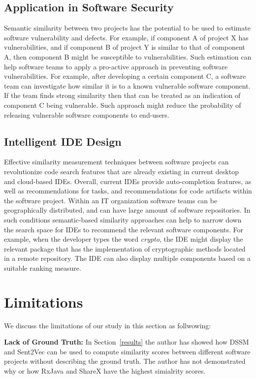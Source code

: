 \documentclass[conference]{IEEEtran}
\begin{document}
\subsection{Application in Software Security}
Semantic similarity between two projects has the potential to be used to estimate software vulnerability and defects. For example, if component A of project X has vulnerabilities, and if component B of project Y is similar to that of component A, then component B might be susceptible to vulnerabilities. Such estimation can help software teams to apply a pro-active approach in preventing software vulnerabilities. For example, after developing a certain component C, a software team can investigate how similar it is to a known vulnerable software component. If the team finds strong similarity then that can be treated as an indication of component C being vulnerable. Such approach might reduce the probability of releasing vulnerable software components to end-users. 
\subsection{Intelligent IDE Design}  
Effective similarity measurement techniques between software projects can revolutionize code search features that are already existing in current desktop and cloud-based IDEs. Overall, current IDEs provide auto-completion features, as well as recommendations for tasks, and recommendations for code artifacts within the software project. Within an IT organization software teams can be geographically distributed, and can have large amount of software repositories. In such conditions semantic-based similarity approaches can help to narrow down the search space for IDEs to recommend the relevant software components. For example, when the developer types the word \textit{crypto}, the IDE might display the relevant package that has the implementation of cryptographic methods located in a remote repository. The IDE can also display multiple components based on a suitable ranking measure.  




\section{Limitations}
\label{limitation}
We discuss the limitations of our study in this section as follwowing: 

\textbf{Lack of Ground Truth:} In Section~\ref{results} the author has showed how DSSM and Sent2Vec can be used to compute similarity scores between different software projects without describing the ground truth. The author has not demonstrated why or how RxJava and ShareX have the highest simialrity scores.   
\end{document}
